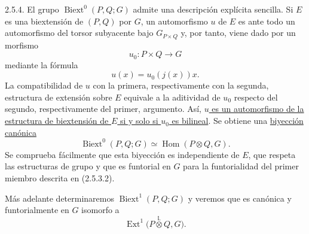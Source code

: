 2.5.4. El grupo $\operatorname{Biext}^{0}(P,Q;G)$ admite una
descripción explícita sencilla. Si $E$ es una biextensión de $(P,Q)$
por $G$, un automorfismo $u$ de $E$ es ante todo un automorfismo del
torsor subyacente bajo $G_{P\times Q}$ y, por tanto, viene dado por un
morfismo
\[
 u_0:P\times Q\longrightarrow G
\]
mediante la fórmula
\[
 u(x)=u_0(j(x))x.
\]
La compatibilidad de $u$ con la primera, respectivamente con la
segunda, estructura de extensión sobre $E$ equivale a la aditividad de
$u_0$ respecto del segundo, respectivamente del primer, argumento.
Así, \underline{$u$ es un automorfismo de la estructura de biextensión
de $E$ si y solo si $u_0$ es bilineal}. Se obtiene una
\underline{biyección canónica}
\begin{equation}\tag{2.5.4.1}
 \operatorname{Biext}^{0}(P,Q;G)
 \simeq
 \operatorname{Hom}(P\otimes Q,G).
\end{equation}
Se comprueba fácilmente que esta biyección es independiente de $E$,
que respeta las estructuras de grupo y que es funtorial en $G$ para la
funtorialidad del primer miembro descrita en (2.5.3.2).

Más adelante determinaremos $\operatorname{Biext}^{1}(P,Q;G)$ y
veremos que es canónica y funtorialmente en $G$ isomorfo a
\[
 \operatorname{Ext}^{1}
 \bigl(P\overset{\mathbb L}{\otimes}Q,G\bigr).
\]

